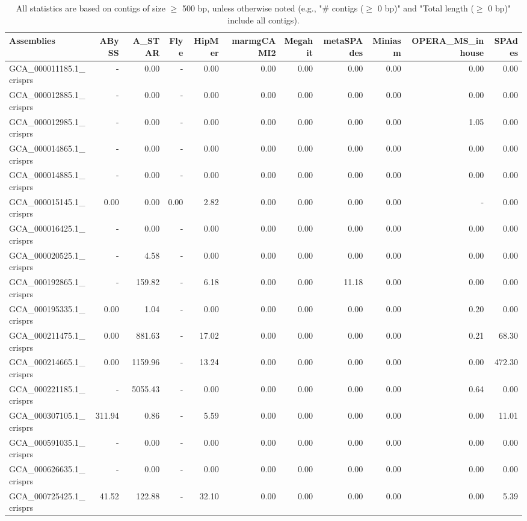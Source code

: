 \documentclass[12pt,a4paper]{article}
\begin{document}
\begin{table}[ht]
\begin{center}
\caption{All statistics are based on contigs of size $\geq$ 500 bp, unless otherwise noted (e.g., "\# contigs ($\geq$ 0 bp)" and "Total length ($\geq$ 0 bp)" include all contigs).}
\begin{tabular}{|l*{10}{|r}|}
\hline
Assemblies & ABySS & A\_STAR & Flye & HipMer & marmgCAMI2 & Megahit & metaSPAdes & Miniasm & OPERA\_MS\_inhouse & SPAdes \\ \hline
GCA\_000011185.1\_crisprs & - & 0.00 & - & 0.00 & 0.00 & 0.00 & 0.00 & 0.00 & 0.00 & 0.00 \\ \hline
GCA\_000012885.1\_crisprs & - & 0.00 & - & 0.00 & 0.00 & 0.00 & 0.00 & 0.00 & 0.00 & 0.00 \\ \hline
GCA\_000012985.1\_crisprs & - & 0.00 & - & 0.00 & 0.00 & 0.00 & 0.00 & 0.00 & 1.05 & 0.00 \\ \hline
GCA\_000014865.1\_crisprs & - & 0.00 & - & 0.00 & 0.00 & 0.00 & 0.00 & 0.00 & 0.00 & 0.00 \\ \hline
GCA\_000014885.1\_crisprs & - & 0.00 & - & 0.00 & 0.00 & 0.00 & 0.00 & 0.00 & 0.00 & 0.00 \\ \hline
GCA\_000015145.1\_crisprs & 0.00 & 0.00 & 0.00 & 2.82 & 0.00 & 0.00 & 0.00 & 0.00 & - & 0.00 \\ \hline
GCA\_000016425.1\_crisprs & - & 0.00 & - & 0.00 & 0.00 & 0.00 & 0.00 & 0.00 & 0.00 & 0.00 \\ \hline
GCA\_000020525.1\_crisprs & - & 4.58 & - & 0.00 & 0.00 & 0.00 & 0.00 & 0.00 & 0.00 & 0.00 \\ \hline
GCA\_000192865.1\_crisprs & - & 159.82 & - & 6.18 & 0.00 & 0.00 & 11.18 & 0.00 & 0.00 & 0.00 \\ \hline
GCA\_000195335.1\_crisprs & 0.00 & 1.04 & - & 0.00 & 0.00 & 0.00 & 0.00 & 0.00 & 0.20 & 0.00 \\ \hline
GCA\_000211475.1\_crisprs & 0.00 & 881.63 & - & 17.02 & 0.00 & 0.00 & 0.00 & 0.00 & 0.21 & 68.30 \\ \hline
GCA\_000214665.1\_crisprs & 0.00 & 1159.96 & - & 13.24 & 0.00 & 0.00 & 0.00 & 0.00 & 0.00 & 472.30 \\ \hline
GCA\_000221185.1\_crisprs & - & 5055.43 & - & 0.00 & 0.00 & 0.00 & 0.00 & 0.00 & 0.64 & 0.00 \\ \hline
GCA\_000307105.1\_crisprs & 311.94 & 0.86 & - & 5.59 & 0.00 & 0.00 & 0.00 & 0.00 & 0.00 & 11.01 \\ \hline
GCA\_000591035.1\_crisprs & - & 0.00 & - & 0.00 & 0.00 & 0.00 & 0.00 & 0.00 & 0.00 & 0.00 \\ \hline
GCA\_000626635.1\_crisprs & - & 0.00 & - & 0.00 & 0.00 & 0.00 & 0.00 & 0.00 & 0.00 & 0.00 \\ \hline
GCA\_000725425.1\_crisprs & 41.52 & 122.88 & - & 32.10 & 0.00 & 0.00 & 0.00 & 0.00 & 0.00 & 5.39 \\ \hline
\end{tabular}
\end{center}
\end{table}
\end{document}
